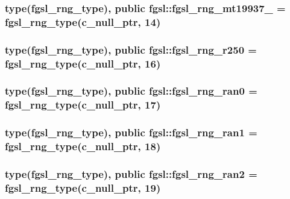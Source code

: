 \subsubsection[{fgsl\+\_\+rng\+\_\+mt19937\+\_\+1999}]{\setlength{\rightskip}{0pt plus 5cm}type({\bf fgsl\+\_\+rng\+\_\+type}), public fgsl\+::fgsl\+\_\+rng\+\_\+mt19937\+\_ = {\bf fgsl\+\_\+rng\+\_\+type}(c\+\_\+null\+\_\+ptr, 14)}\label{namespacefgsl_a9e349dde1852d8ef9eb4bbdcc9de661a}
\hypertarget{namespacefgsl_ada1200ead9fd55af5e211bdd3666dea1}{}
\subsubsection[{fgsl\+\_\+rng\+\_\+r250}]{\setlength{\rightskip}{0pt plus 5cm}type({\bf fgsl\+\_\+rng\+\_\+type}), public fgsl\+::fgsl\+\_\+rng\+\_\+r250 = {\bf fgsl\+\_\+rng\+\_\+type}(c\+\_\+null\+\_\+ptr, 16)}\label{namespacefgsl_ada1200ead9fd55af5e211bdd3666dea1}
\hypertarget{namespacefgsl_a355fcde51e3f3a5d6ad8ea548e7cdb0c}{}
\subsubsection[{fgsl\+\_\+rng\+\_\+ran0}]{\setlength{\rightskip}{0pt plus 5cm}type({\bf fgsl\+\_\+rng\+\_\+type}), public fgsl\+::fgsl\+\_\+rng\+\_\+ran0 = {\bf fgsl\+\_\+rng\+\_\+type}(c\+\_\+null\+\_\+ptr, 17)}\label{namespacefgsl_a355fcde51e3f3a5d6ad8ea548e7cdb0c}
\hypertarget{namespacefgsl_a4b91ddd8f42db11c9ae467f1b8fbe5f2}{}
\subsubsection[{fgsl\+\_\+rng\+\_\+ran1}]{\setlength{\rightskip}{0pt plus 5cm}type({\bf fgsl\+\_\+rng\+\_\+type}), public fgsl\+::fgsl\+\_\+rng\+\_\+ran1 = {\bf fgsl\+\_\+rng\+\_\+type}(c\+\_\+null\+\_\+ptr, 18)}\label{namespacefgsl_a4b91ddd8f42db11c9ae467f1b8fbe5f2}
\hypertarget{namespacefgsl_a82dd93da12a619eb5cbf8a4d32e44daa}{}
\subsubsection[{fgsl\+\_\+rng\+\_\+ran2}]{\setlength{\rightskip}{0pt plus 5cm}type({\bf fgsl\+\_\+rng\+\_\+type}), public fgsl\+::fgsl\+\_\+rng\+\_\+ran2 = {\bf fgsl\+\_\+rng\+\_\+type}(c\+\_\+null\+\_\+ptr, 19)}\label{namespacefgsl_a82dd93da12a619eb5cbf8a4d32e44daa}
\hypertarget{namespacefgsl_a2bcafc9c66a493e0ad7ead60bf9d9a0e}{}
